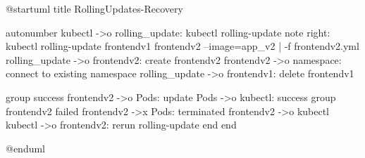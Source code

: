 @startuml
title RollingUpdates-Recovery

autonumber
kubectl ->o rolling_update: kubectl rolling-update
note right: kubectl rolling-update frontendv1 frontendv2 --image=app_v2 | -f frontendv2.yml
rolling_update ->o frontendv2: create frontendv2
frontendv2 ->o namespace: connect to existing namespace
rolling_update ->o frontendv1: delete frontendv1

group success
  frontendv2 ->o Pods: update
  Pods ->o kubectl: success
  group frontendv2 failed
    frontendv2 ->x Pods: terminated
    frontendv2 ->o kubectl
    kubectl ->o frontendv2: rerun rolling-update
    end
end

@enduml
